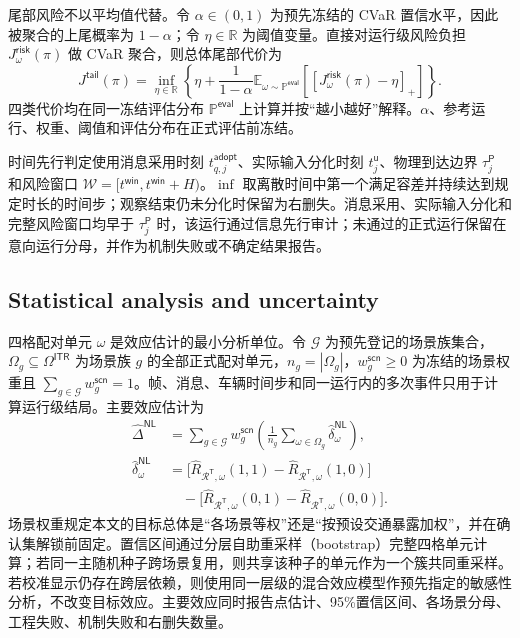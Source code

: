 \documentclass[10pt,a4paper,twocolumn]{article}
\begin{document}
尾部风险不以平均值代替。令 $\alpha\in(0,1)$ 为预先冻结的 CVaR 置信水平，因此被聚合的上尾概率为 $1-\alpha$；令 $\eta\in\mathbb R$ 为阈值变量。直接对运行级风险负担 $J_{\omega}^{\mathsf{risk}}(\pi)$ 做 CVaR 聚合，则总体尾部代价为
\begin{equation*}
J^{\mathsf{tail}}(\pi)=
\inf_{\eta\in\mathbb R}
\left\{\eta+\frac{1}{1-\alpha}
\mathbb E_{\omega\sim\mathbb P^{\mathsf{eval}}}\!\left[\left[J_{\omega}^{\mathsf{risk}}(\pi)-\eta\right]_+\right]\right\}.
\end{equation*}
四类代价均在同一冻结评估分布 $\mathbb P^{\mathsf{eval}}$ 上计算并按“越小越好”解释。$\alpha$、参考运行、权重、阈值和评估分布在正式评估前冻结。

时间先行判定使用消息采用时刻 $t_{q,j}^{\mathsf{adopt}}$、实际输入分化时刻 $t_j^{\mathsf u}$、物理到达边界 $\tau_j^{\mathsf P}$ 和风险窗口 $\mathcal W=[t^{\mathsf{win}},t^{\mathsf{win}}+H)$。$\inf$ 取离散时间中第一个满足容差并持续达到规定时长的时间步；观察结束仍未分化时保留为右删失。消息采用、实际输入分化和完整风险窗口均早于 $\tau_j^{\mathsf P}$ 时，该运行通过信息先行审计；未通过的正式运行保留在意向运行分母，并作为机制失败或不确定结果报告。

\subsection*{Statistical analysis and uncertainty}
四格配对单元 $\omega$ 是效应估计的最小分析单位。令 $\mathcal G$ 为预先登记的场景族集合，$\Omega_g\subseteq\Omega^{\mathsf{ITR}}$ 为场景族 $g$ 的全部正式配对单元，$n_g=|\Omega_g|$，$w_g^{\mathsf{scn}}\geq0$ 为冻结的场景权重且 $\sum_{g\in\mathcal G}w_g^{\mathsf{scn}}=1$。帧、消息、车辆时间步和同一运行内的多次事件只用于计算运行级结局。主要效应估计为
\begin{equation*}
\begin{aligned}
\widehat{\Delta}^{\mathsf{NL}}&=
\sum_{g\in\mathcal G}w_g^{\mathsf{scn}}
\left(\frac{1}{n_g}\sum_{\omega\in\Omega_g}
\widehat{\delta}_{\omega}^{\mathsf{NL}}\right),\\
\widehat{\delta}_{\omega}^{\mathsf{NL}}&=
\bigl[\widehat R_{\mathcal R^{\mathsf T},\omega}(1,1)-\widehat R_{\mathcal R^{\mathsf T},\omega}(1,0)\bigr]\\
&\quad-\bigl[\widehat R_{\mathcal R^{\mathsf T},\omega}(0,1)-\widehat R_{\mathcal R^{\mathsf T},\omega}(0,0)\bigr].
\end{aligned}
\end{equation*}
场景权重规定本文的目标总体是“各场景等权”还是“按预设交通暴露加权”，并在确认集解锁前固定。置信区间通过分层自助重采样（bootstrap）完整四格单元计算；若同一主随机种子跨场景复用，则共享该种子的单元作为一个簇共同重采样。若校准显示仍存在跨层依赖，则使用同一层级的混合效应模型作预先指定的敏感性分析，不改变目标效应。主要效应同时报告点估计、95\%置信区间、各场景分母、工程失败、机制失败和右删失数量。
\end{document}
